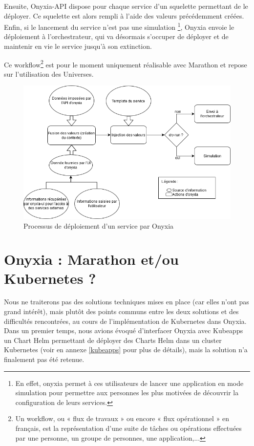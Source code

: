 \documentclass[11pt,fleqn]{book} %
\begin{document}
Ensuite, Onyxia-API dispose pour chaque service d'un squelette permettant de le déployer. Ce squelette est alors rempli à l'aide des valeurs précédemment créées.\\

Enfin, si le lancement du service n'est pas une simulation \footnote{En effet, onyxia permet à ces utilisateurs de lancer une application en mode simulation pour permettre aux personnes les plus motivées de découvrir la configuration de leurs services.}, Onyxia envoie le déploiement à l'orchestrateur, qui va désormais s'occuper de déployer et de maintenir en vie le service jusqu'à son extinction.

Ce workflow\footnote{Un workflow, ou « flux de travaux » ou encore « flux opérationnel » en français, est la représentation d'une suite de tâches ou opérations effectuées par une personne, un groupe de personnes, une application,... } est pour le moment uniquement réalisable avec Marathon et repose sur l'utilisation des Universes.\\




\begin{figure}[H]
\renewcommand{\figurename}{Diagramme}
\hspace{-1cm}
\includegraphics[scale=0.7]{Pictures/onyxia/onyxia-simplifie.png}
\captionsetup{margin=1.5cm,format=hang,justification=justified}
\caption[]{Processus de déploiement d'un service par Onyxia \newline}
\end{figure}



\section{Onyxia : Marathon et/ou Kubernetes ?}
Nous ne traiterons pas des solutions techniques mises en place (car elles n'ont pas grand intérêt), mais plutôt des points communs entre les deux solutions et des difficultés rencontrées, au cours de l'implémentation de Kubernetes dans Onyxia. Dans un premier temps, nous avions évoqué d'interfacer Onyxia avec Kubeapps un Chart Helm permettant de déployer des Charts Helm dans un cluster Kubernetes (voir en annexe \ref{kubeapps} pour plus de détails), mais la solution n'a finalement pas été retenue.\newline
\end{document}
